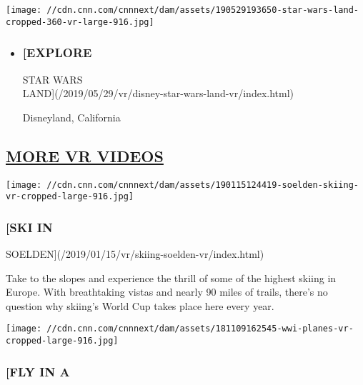 \href{/2019/05/29/vr/disney-star-wars-land-vr/index.html}{}

\texttt{[image: //cdn.cnn.com/cnnnext/dam/assets/190529193650-star-wars-land-cropped-360-vr-large-916.jpg]}

\begin{itemize}
\item
  \hypertarget{explore}{%
  \subsubsection{{[}EXPLORE}\label{explore}}

  STAR WARS\\
  LAND{]}(/2019/05/29/vr/disney-star-wars-land-vr/index.html)

  Disneyland, California
\end{itemize}

\hypertarget{more-vr-videos-}{%
\subsection{\texorpdfstring{\href{/specials/vr/vr-archives}{MORE VR
VIDEOS}~}{MORE VR VIDEOS~}}\label{more-vr-videos-}}

\href{/2019/01/15/vr/skiing-soelden-vr/index.html}{}

\texttt{[image: //cdn.cnn.com/cnnnext/dam/assets/190115124419-soelden-skiing-vr-cropped-large-916.jpg]}

\hypertarget{ski-in}{%
\subsubsection{{[}SKI IN}\label{ski-in}}

SOELDEN{]}(/2019/01/15/vr/skiing-soelden-vr/index.html)

Take to the slopes and experience the thrill of some of the highest
skiing in Europe. With breathtaking vistas and nearly 90 miles of
trails, there's no question why skiing's World Cup takes place here
every year.

\href{/2018/11/09/vr/wwi-anniversary-planes-vr/index.html}{}

\texttt{[image: //cdn.cnn.com/cnnnext/dam/assets/181109162545-wwi-planes-vr-cropped-large-916.jpg]}

\hypertarget{fly-in-a}{%
\subsubsection{{[}FLY IN A}\label{fly-in-a}}

